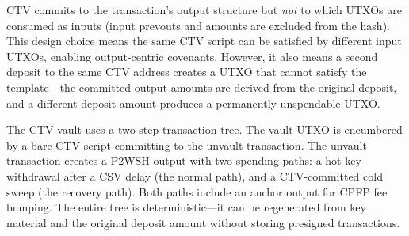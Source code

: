 CTV commits to the transaction's output structure but \emph{not} to which UTXOs are
consumed as inputs (input prevouts and amounts are excluded from the hash). This
design choice means the same CTV script can be satisfied by different input UTXOs,
enabling output-centric covenants. However, it also means a second deposit to the same
CTV address creates a UTXO that cannot satisfy the template---the committed output
amounts are derived from the original deposit, and a different deposit amount produces
a permanently unspendable UTXO.

The CTV vault uses a two-step transaction tree. The vault UTXO is encumbered by a bare
CTV script committing to the unvault transaction. The unvault transaction creates a
P2WSH output with two spending paths: a hot-key withdrawal after a CSV delay (the
normal path), and a CTV-committed cold sweep (the recovery path). Both paths include
an anchor output for CPFP fee bumping. The entire tree is deterministic---it can be
regenerated from key material and the original deposit amount without storing presigned
transactions.

